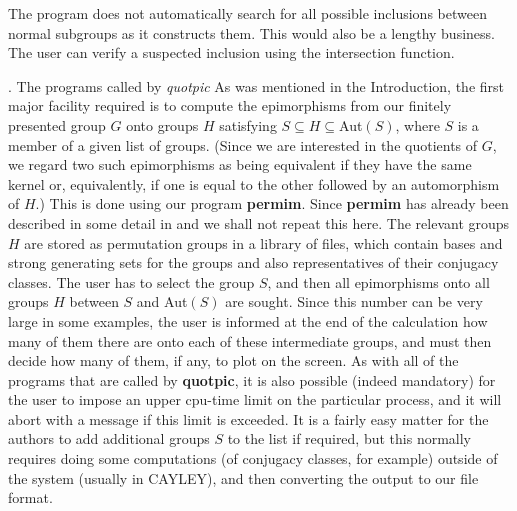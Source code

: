 The program does not automatically search for all possible inclusions between
normal subgroups as it constructs them. This would also be a lengthy business.
The user can verify a suspected inclusion using the intersection function.
 

. The programs called by {\it quotpic}                %
\endhead                             %
As was mentioned in the Introduction, the first major facility required is
to compute the epimorphisms from our finitely presented group $G$ onto groups
$H$ satisfying $S \subseteq H \subseteq$Aut$(S)$, where $S$ is a member of a
given list of groups. (Since we are interested in the quotients of $G$, we
regard two such epimorphisms as being equivalent if they have the same kernel
or, equivalently, if one is equal to the other followed by an automorphism of
$H$.) This is done using our program {\bf permim}. Since {\bf permim } has
already been described in some detail in \cite{5} and \cite{7} we shall not
repeat this here. The relevant groups $H$ are stored as permutation groups in
a library of files, which contain bases and strong generating sets for the
groups and also representatives of their conjugacy classes. The user has to
select the group $S$, and then all epimorphisms onto all groups $H$ between
$S$ and Aut$(S)$ are sought. Since this number can be very large in some
examples, the user is informed at the end of the calculation how many of
them there are onto each of these intermediate groups, and must then decide
how many of them, if any, to plot on the screen. As
with all of the programs that are called by {\bf quotpic}, it is also possible
(indeed mandatory) for the user to impose an upper cpu-time limit on the
particular process, and it will abort with a message if this limit is
exceeded. It is a fairly easy matter for the authors to add additional groups
$S$ to the list if required, but this normally requires doing some
computations (of conjugacy classes, for example) outside of the system
(usually in CAYLEY), and then converting the output to our file format.

